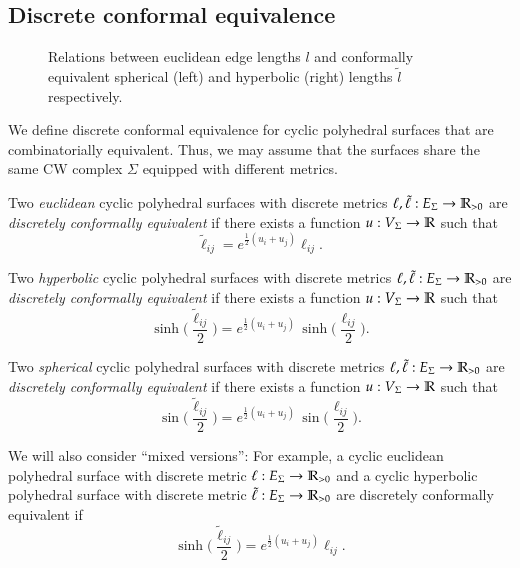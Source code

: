 \documentclass[Thesis.tex]{subfiles}
\begin{document}
\subsection{Discrete conformal equivalence}
\label{sec:discr-conf-equiv}

\begin{figure}
\centering
\resizebox{0.6\textwidth}{!}{


}
\caption{Relations between euclidean edge lengths $l$ and conformally equivalent spherical (left) and hyperbolic (right) lengths $\tilde l$ respectively.}
\label{fig:geometries}
\end{figure}


We define discrete conformal equivalence for cyclic polyhedral
surfaces that are combinatorially equivalent. Thus, we may assume that
the surfaces share the same CW complex $\Sigma$ equipped with
different metrics.

Two \emph{euclidean} cyclic polyhedral surfaces with
discrete metrics $\ell,\tilde\ell:E_{\Sigma}\rightarrow\mathbb R_{>0}$ are
\emph{discretely conformally equivalent} if there exists a function
$u:V_{\Sigma}\rightarrow\mathbb R$ such that
\begin{equation}
\label{eq:tilde_ell_euc}
\tilde\ell_\mathit{ij}=e^{\frac{1}{2}(u_{i}+u_{j})}\ell_\mathit{ij}.
\end{equation}

Two \emph{hyperbolic} cyclic polyhedral surfaces with
discrete metrics $\ell,\tilde\ell:E_{\Sigma}\rightarrow\mathbb R_{>0}$ are
\emph{discretely conformally equivalent} if there exists a function
$u:V_{\Sigma}\rightarrow\mathbb R$ such that
\begin{equation}
\label{eq:tilde_ell_hyp}
\sinh\Big(\frac{\tilde\ell_\mathit{ij}}{2}\Big)
= e^{\frac{1}{2}(u_{i}+u_{j})}\,
\sinh\Big(\frac{\ell_\mathit{ij}}{2}\Big).
\end{equation}


Two \emph{spherical} cyclic polyhedral surfaces with
discrete metrics $\ell,\tilde\ell:E_{\Sigma}\rightarrow\mathbb R_{>0}$ are
\emph{discretely conformally equivalent} if there exists a function
$u:V_{\Sigma}\rightarrow\mathbb R$ such that
\begin{equation}
\label{eq:tilde_ell_sph}
\sin\Big(\frac{\tilde\ell_\mathit{ij}}{2}\Big)
= e^{\frac{1}{2}(u_{i}+u_{j})}\,
\sin\Big(\frac{\ell_\mathit{ij}}{2}\Big).
\end{equation}

We will also consider ``mixed versions'': For example, a cyclic
euclidean polyhedral surface with discrete metric
$\ell:E_{\Sigma}\rightarrow\mathbb R_{>0}$ and a cyclic hyperbolic polyhedral
surface with discrete metric $\tilde\ell:E_{\Sigma}\rightarrow\mathbb R_{>0}$
are discretely conformally equivalent if
\begin{equation*}
\sinh\Big(\frac{\tilde\ell_\mathit{ij}}{2}\Big)
= e^{\frac{1}{2}(u_{i}+u_{j})}\ell_\mathit{ij}.
\end{equation*}
\end{document}
